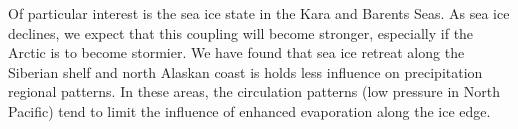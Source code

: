 Of particular interest is the sea ice state in the Kara and Barents Seas.
As sea ice declines, we expect that this coupling will become stronger, especially if the Arctic is to become stormier.
We have found that sea ice retreat along the Siberian shelf and north Alaskan coast is holds less influence on precipitation regional patterns.
In these areas, the circulation patterns (low pressure in North Pacific) tend to limit the influence of enhanced evaporation along the ice edge.
